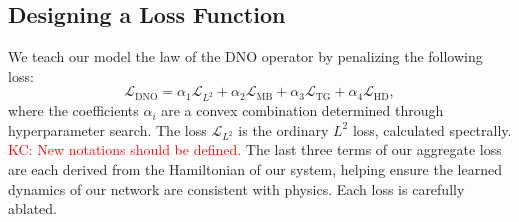 \documentclass{article}
\newcommand{\kc}[1]{\textcolor{red}{KC: #1}}
\begin{document}
\subsection{Designing a Loss Function}
\label{section:loss-fn}
We teach our model the law of the DNO operator by penalizing the following
loss:
\begin{equation}
    \mathcal L_{\mathrm{DNO}}=
    \alpha_1\mathcal L_{L^2}+\alpha_2\mathcal L_{\mathrm{MB}}
    +\alpha_3\mathcal L_{\mathrm{TG}}+\alpha_4\mathcal L_{\mathrm{HD}},
\end{equation}
where the coefficients $\alpha_i$ are a convex combination determined through
hyperparameter search. The loss $\mathcal L_{L^2}$ is the ordinary $L^2$
loss, calculated spectrally. \kc{New notations should be defined.}
The last three terms of our aggregate loss are each derived from the
Hamiltonian of our system, helping ensure the learned dynamics of our
network are consistent with physics. Each loss is carefully ablated.
\end{document}
